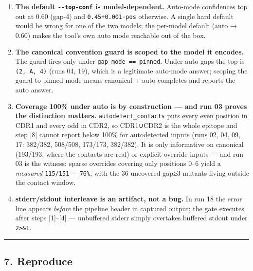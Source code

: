 \documentclass[12pt,a4paper]{article}
\providecommand{\tightlist}{%
  \setlength{\itemsep}{0pt}\setlength{\parskip}{0pt}%
}
\begin{document}
\begin{enumerate}
\def\labelenumi{\arabic{enumi}.}
\tightlist
\item
  \textbf{The default \texttt{-\/-top-conf} is model-dependent.}
  Auto-mode confidences top out at 0.60 (gap-4) and
  \texttt{0.45+0.001·pos} otherwise. A single hard default would be
  wrong for one of the two models; the per-model default (auto → 0.60)
  makes the tool's own auto mode reachable out of the box.
\item
  \textbf{The canonical convention guard is scoped to the model it
  encodes.} The guard fires only under
  \texttt{gap\_mode\ ==\ \textquotesingle{}pinned\textquotesingle{}}.
  Under auto gaps the top is
  \texttt{(2,\ \textquotesingle{}A\textquotesingle{},\ 4)} (runs 04,
  19), which is a legitimate auto-mode answer; scoping the guard to
  pinned mode means canonical + auto completes and reports the auto
  answer.
\item
  \textbf{Coverage 100\% under auto is by construction --- and run 03
  proves the distinction matters.} \texttt{autodetect\_contacts} puts
  every even position in CDR1 and every odd in CDR2, so CDR1∪CDR2 is the
  whole epitope and step {[}8{]} cannot report below 100\% for
  autodetected inputs (runs 02, 04, 09, 17: 382/382, 508/508, 173/173,
  382/382). It is only informative on canonical (193/193, where the
  contacts are real) or explicit-override inputs --- and run 03 is the
  witness: sparse overrides covering only positions 0--6 yield a
  \emph{measured} \texttt{115/151\ —\ 76\%}, with the 36 uncovered gap≥3
  mutants living outside the contact window.
\item
  \textbf{stderr/stdout interleave is an artifact, not a bug.} In run 18
  the error line appears \emph{before} the pipeline header in captured
  output; the gate executes after steps {[}1{]}--{[}4{]} --- unbuffered
  stderr simply overtakes buffered stdout under
  \texttt{2\textgreater{}\&1}.
\end{enumerate}

\begin{center}\rule{0.5\linewidth}{0.5pt}\end{center}

\hypertarget{reproduce}{%
\subsection{7. Reproduce}\label{reproduce}}
\end{document}
